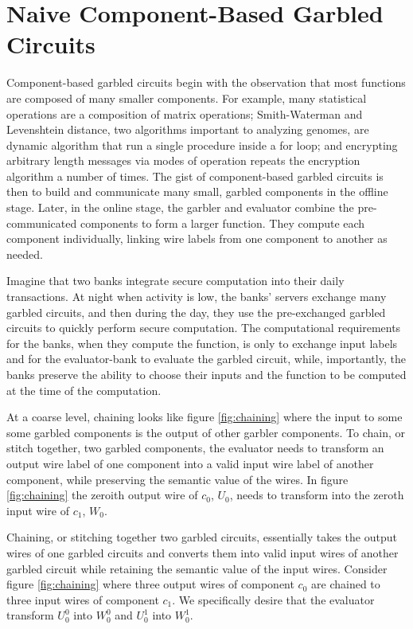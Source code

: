 \section{Naive Component-Based Garbled Circuits}
Component-based garbled circuits begin with the observation that most functions are composed of many smaller components. 
For example, many statistical operations are a composition of matrix operations; Smith-Waterman and Levenshtein distance, two algorithms important to analyzing genomes, are dynamic algorithm that run a single procedure inside a for loop; and encrypting arbitrary length messages via modes of operation repeats the encryption algorithm a number of times.
The gist of component-based garbled circuits is then to build and communicate many small, garbled components in the offline stage.
Later, in the online stage, the garbler and evaluator combine the pre-communicated components to form a larger function. 
They compute each component individually, linking wire labels from one component to another as needed. 

Imagine that two banks integrate secure computation into their daily transactions.
At night when activity is low, the banks' servers exchange many garbled circuits, and then during the day, they use the pre-exchanged garbled circuits to quickly perform secure computation.
The computational requirements for the banks, when they compute the function, is only to exchange input labels and for the evaluator-bank to evaluate the garbled circuit, while, importantly, the banks preserve the ability to choose their inputs and the function to be computed at the time of the computation. 



At a coarse level, chaining looks like figure \ref{fig:chaining} where the input to some some garbled components is the output of other garbler components. 
To chain, or stitch together, two garbled components, the evaluator needs to transform an output wire label of one component into a valid input wire label of another component, while preserving the semantic value of the wires. 
In figure \ref{fig:chaining} the zeroith output wire of $c_0$, $U_0$, needs to transform into the zeroth input wire of $c_1$, $W_0$. 

Chaining, or stitching together two garbled circuits, essentially takes the output wires of one garbled circuits and converts them into valid input wires of another garbled circuit while retaining the semantic value of the input wires.
Consider figure \ref{fig:chaining} where three output wires of component $c_0$ are chained to three input wires of component $c_1$. 
We specifically desire that the evaluator transform $U_0^0$ into $W_0^0$ and $U_0^1$ into $W_0^1$. 

